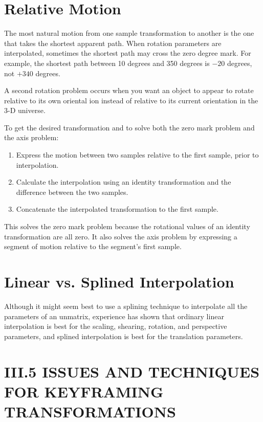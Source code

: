 \section{Relative Motion}
The most natural motion from one sample transformation to another is the one that takes the shortest apparent path. When rotation parameters are interpolated, sometimes the shortest path may cross the zero degree mark. For example, the shortest path between 10 degrees and 350 degrees is $-20$ degrees, not $+340$ degrees.

A second rotation problem occurs when you want an object to appear to rotate relative to its own oriental ion instead of relative to its current orientation in the 3-D universe.

To get the desired transformation and to solve both the zero mark problem and the axis problem:

\begin{enumerate}
  \item Express the motion between two samples relative to the first sample, prior to interpolation.

  \item Calculate the interpolation using an identity transformation and the difference between the two samples.

  \item Concatenate the interpolated transformation to the first sample.

\end{enumerate}

This solves the zero mark problem because the rotational values of an identity transformation are all zero. It also solves the axis problem by expressing a segment of motion relative to the segment's first sample.

\section{Linear vs. Splined Interpolation}
Although it might seem best to use a splining technique to interpolate all the parameters of an unmatrix, experience has shown that ordinary linear interpolation is best for the scaling, shearing, rotation, and perspective parameters, and splined interpolation is best for the translation parameters.

\section{III.5 ISSUES AND TECHNIQUES FOR KEYFRAMING TRANSFORMATIONS}
